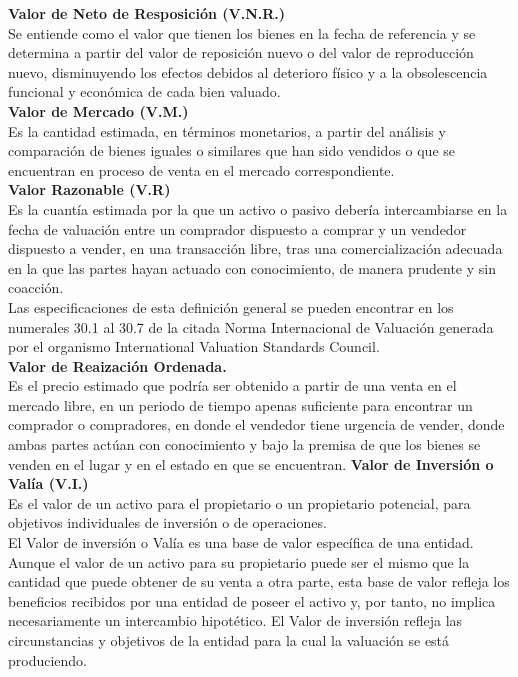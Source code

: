 \textbf{Valor de Neto de Resposición (V.N.R.)} \\ 
Se entiende como el valor que tienen los bienes en la fecha de referencia y se determina a partir del valor de reposición nuevo o del valor de reproducción nuevo, disminuyendo los efectos debidos al deterioro físico y a la obsolescencia funcional y económica de cada bien valuado. \\[6mm] 
\textbf{Valor de Mercado (V.M.)} \\ 
Es la cantidad estimada, en términos monetarios, a partir del análisis y comparación de bienes iguales o similares que han sido vendidos o que se encuentran en proceso de venta en el mercado correspondiente. \\[6mm]
\textbf{Valor Razonable (V.R)} \\ 
Es la cuantía estimada por la que un activo o pasivo debería intercambiarse en la fecha de valuación entre un comprador dispuesto a comprar y un vendedor dispuesto a vender, en una transacción libre, tras una comercialización adecuada en la que las partes hayan actuado con conocimiento, de manera prudente y sin coacción. \\ 
Las especificaciones de esta definición general se pueden encontrar en los numerales 30.1 al 30.7 de la citada Norma Internacional de Valuación generada por el organismo International Valuation Standards Council. \\[6mm] 
\textbf{Valor de Reaización Ordenada.} \\ 
Es el precio estimado que podría ser obtenido a partir de una venta en el mercado libre, 
en un periodo de tiempo apenas suficiente para encontrar un comprador o compradores, 
en donde el vendedor tiene urgencia de vender, donde ambas partes actúan con 
conocimiento y bajo la premisa de que los bienes se venden en el lugar y en el
estado en que se encuentran.
\textbf{Valor de Inversión o Valía (V.I.)} \\ 
Es el valor de un activo para el propietario o un propietario potencial, para objetivos individuales de inversión o de operaciones. \\ 
El Valor de inversión o Valía es una base de valor específica de una entidad. 
Aunque el valor de un activo para su propietario puede ser el mismo que la cantidad que puede obtener de su venta a otra parte, esta base de valor refleja los beneficios recibidos por una entidad de poseer el activo y, por tanto, no implica necesariamente un intercambio hipotético. 
El Valor de inversión refleja las circunstancias y objetivos de la entidad para la cual la valuación se está produciendo. 
